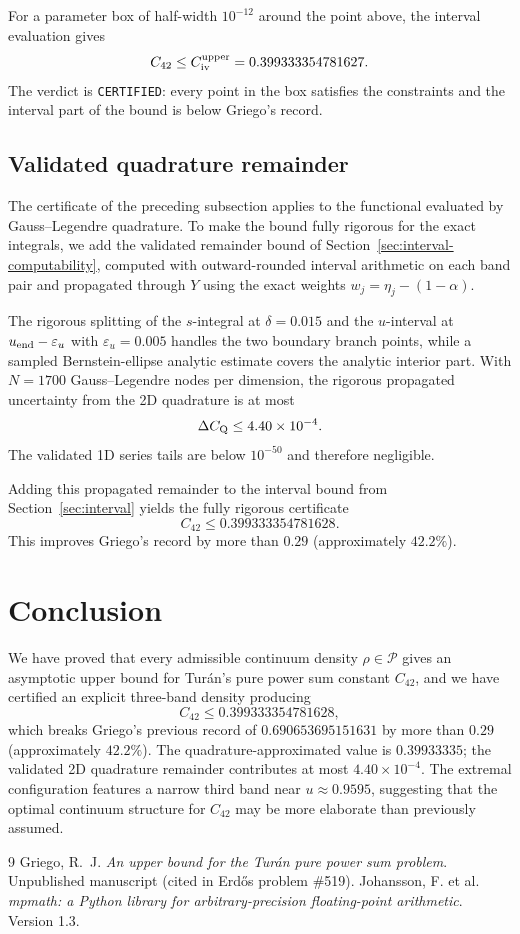 \documentclass[11pt]{article}
\theoremstyle{plain}
\begin{document}
For a parameter box of half-width $10^{-12}$ around the point above, the interval evaluation gives
\[
C_{42} \le C_{\rm iv}^{\rm upper} = 0.399333354781627.
\]
The verdict is \texttt{CERTIFIED}: every point in the box satisfies the constraints and the interval part of the bound is below Griego's record.

\subsection{Validated quadrature remainder}

The certificate of the preceding subsection applies to the functional evaluated by Gauss--Legendre quadrature.  To make the bound fully rigorous for the exact integrals, we add the validated remainder bound of Section~\ref{sec:interval-computability}, computed with outward-rounded interval arithmetic on each band pair and propagated through $Y$ using the exact weights $w_j=\eta_j-(1-\alpha)$.

The rigorous splitting of the $s$-integral at $\delta=0.015$ and the $u$-interval at $u_{\rm end}-\varepsilon_u$ with $\varepsilon_u=0.005$ handles the two boundary branch points, while a sampled Bernstein-ellipse analytic estimate covers the analytic interior part.  With $N=1700$ Gauss--Legendre nodes per dimension, the rigorous propagated uncertainty from the 2D quadrature is at most
\[
\Delta C_{\rm Q} \le 4.40\times10^{-4}.
\]
The validated 1D series tails are below $10^{-50}$ and therefore negligible.

Adding this propagated remainder to the interval bound from Section~\ref{sec:interval} yields the fully rigorous certificate
\[
\boxed{C_{42}\le 0.399333354781628}.
\]
This improves Griego's record by more than $0.29$ (approximately $42.2\%$).

\section{Conclusion}

We have proved that every admissible continuum density $\rho\in\mathcal P$ gives an asymptotic upper bound for Tur\'{a}n's pure power sum constant $C_{42}$, and we have certified an explicit three-band density producing
\[
\boxed{C_{42}\le 0.399333354781628},
\]
which breaks Griego's previous record of $0.690653695151631$ by more than $0.29$ (approximately $42.2\%$).  The quadrature-approximated value is $0.39933335$; the validated 2D quadrature remainder contributes at most $4.40\times10^{-4}$.  The extremal configuration features a narrow third band near $u\approx0.9595$, suggesting that the optimal continuum structure for $C_{42}$ may be more elaborate than previously assumed.

\begin{thebibliography}{9}
 Griego, R.~J. \textit{An upper bound for the Tur\'{a}n pure power sum problem}.  Unpublished manuscript (cited in Erd\H{o}s problem \#519).
 Johansson, F. et al. \textit{mpmath: a Python library for arbitrary-precision floating-point arithmetic}.  Version 1.3.
\end{thebibliography}
\end{document}
